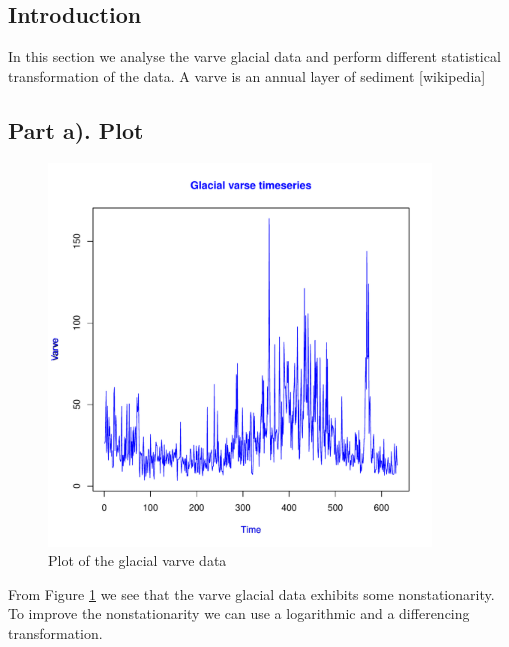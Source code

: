 \documentclass[11pt, oneside]{article}   	%
\begin{document}
\subsection{Introduction}
In this section we analyse the varve glacial data and perform different statistical transformation of the data. A varve is an annual layer of sediment [wikipedia]
\subsection{Part a). Plot}
\begin{figure}[H] %
   \centering
   \includegraphics[width=4in]{sample_plot} 
   \caption{Plot of the glacial varve data}
   \label{fig:varve}
\end{figure}
From Figure \ref{fig:varve} we see that the varve glacial data exhibits some nonstationarity. To improve the nonstationarity we can use a logarithmic and a differencing transformation.
\end{document}
